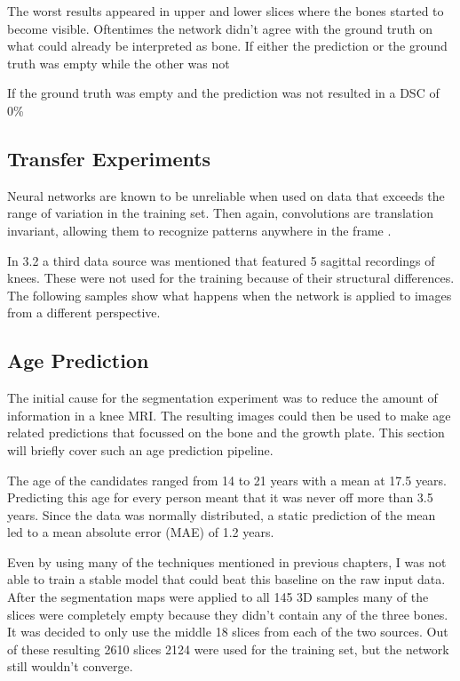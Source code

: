 The worst results appeared in upper and lower slices where the bones started to become visible. Oftentimes the network didn't agree with the ground truth on what could already be interpreted as bone. If either the prediction or the ground truth was empty while the other was not 

If the ground truth was empty and the prediction was not resulted in a DSC of 0\%

\subsection{Transfer Experiments}

Neural networks are known to be unreliable when used on data that exceeds the range of variation in the training set. Then again, convolutions are translation invariant, allowing them to recognize patterns anywhere in the frame \cite{Chollet2017}. 

In 3.2 a third data source was mentioned that featured 5 sagittal recordings of knees. These were not used for the training because of their structural differences. The following samples show what happens when the network is applied to images from a different perspective.


\subsection{Age Prediction}

The initial cause for the segmentation experiment was to reduce the amount of information in a knee MRI. The resulting images could then be used to make age related predictions that focussed on the bone and the growth plate. This section will briefly cover such an age prediction pipeline.

The age of the candidates ranged from 14 to 21 years with a mean at 17.5 years. Predicting this age for every person meant that it was never off more than 3.5 years. Since the data was normally distributed, a static prediction of the mean led to a mean absolute error (MAE) of 1.2 years.

Even by using many of the techniques mentioned in previous chapters, I was not able to train a stable model that could beat this baseline on the raw input data. After the segmentation maps were applied to all 145 3D samples many of the slices were completely empty because they didn't contain any of the three bones. It was decided to only use the middle 18 slices from each of the two sources. Out of these resulting 2610 slices 2124 were used for the training set, but the network still wouldn't converge.

